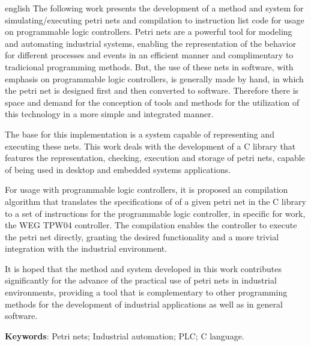 \begin{resumo}[Abstract]
\begin{otherlanguage*}{english}
The following work presents the development of a method and system for simulating/executing petri nets and compilation to instruction list code for usage on programmable logic controllers. Petri nets are a powerful tool for modeling and automating industrial systems, enabling the representation of the behavior for different processes and events in an efficient manner and complimentary to tradicional programming methods. But, the use of these nets in software, with emphasis on programmable logic controllers, is generally made by hand, in which the petri net is designed first and then converted to software. Therefore there is space and demand for the conception of tools and methods for the utilization of this technology in a more simple and integrated manner. 

The base for this implementation is a system capable of representing and executing these nets. This work deals with the development of a C library that features the representation, checking, execution and storage of petri nets, capable of being used in desktop and embedded systems applications. 

For usage with programmable logic controllers, it is proposed an compilation algorithm that translates the specifications of of a given petri net in the C library to a set of instructions for the programmable logic controller, in specific for work, the WEG TPW04 controller. The compilation enables the controller to execute the petri net directly, granting the desired functionality and a more trivial integration with the industrial environment.

It is hoped that the method and system developed in this work contributes significantly for the advance of the practical use of petri nets in industrial environments, providing a tool that is complementary to other programming methods for the development of industrial applications as well as in general software.

\textbf{Keywords}: Petri nets; Industrial automation; PLC; C language.
\end{otherlanguage*}
\end{resumo}